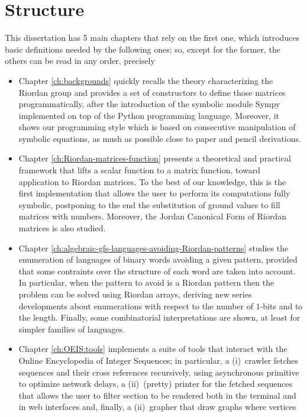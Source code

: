 \section*{Structure}

This dissertation has 5 main chapters that rely on the first one, which
introduces basic definitions needed by the following ones; so, except for the
former, the others can be read in any order, precisely
\begin{itemize}
\item Chapter \ref{ch:backgrounds} quickly recalls the theory characterizing
the Riordan group and provides a set of constructors to define those matrices
programmatically, after the introduction of the symbolic module Sympy
implemented on top of the Python programming language. Moreover, it shows our
programming style which is based on consecutive manipulation of symbolic
equations, as mush as possible close to paper and pencil derivations.
\item Chapter \ref{ch:Riordan-matrices-function} presents a theoretical and
practical framework that lifts a scalar function to a matrix function, toward
application to Riordan matrices. To the best of our knowledge, this is the
first implementation that allows the user to perform its computations fully
symbolic, postponing to the end the substitution of ground values to fill
matrices with numbers. Moreover, the Jordan Canonical Form of Riordan matrices
is also studied.
\item Chapter \ref{ch:algebraic-gfs-languages-avoiding-Riordan-patterns}
studies the enumeration of languages of binary words avoiding a given pattern,
provided that some contraints over the structure of each word are taken into
account.  In particular, when the pattern to avoid is a Riordan pattern then
the problem can be solved using Riordan arrays, deriving new series
developments about enumerations with respect to the number of $1$-bits and to
the length. Finally, some combinatorial interpretations are shown, at least for
simpler families of languages.
\item Chapter \ref{ch:OEIS:tools} implements a suite of tools that interact with
the Online Encyclopedia of Integer Sequences; in particular, a (i)~crawler fetches
sequences and their cross references recursively, using asynchronous primitive
to optimize network delays, a (ii)~(pretty) printer for the fetched sequences that
allows the user to filter section to be rendered both in the terminal and in
web interfaces and, finally, a (ii)~grapher that draw graphs where vertices

\end{itemize}
